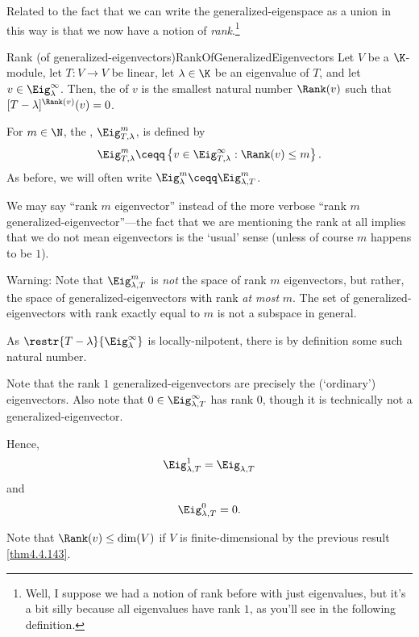Related to the fact that we can write the generalized-eigenspace as a union in this way is that we now have a notion of \emph{rank}.\footnote{Well, I suppose we had a notion of rank before with just eigenvalues, but it's a bit silly because all eigenvalues have rank $1$, as you'll see in the following definition.}
\begin{dfn}{Rank (of generalized-eigenvec\-tors)}{RankOfGeneralizedEigenvectors}
	Let $V$ be a $\K$-module, let $T\colon V\rightarrow V$ be linear, let $\lambda \in \K$ be an eigenvalue of $T$, and let $v\in \Eig _{\lambda}^{\infty}$.  Then, the  of $v$ is the smallest natural number $\Rank (v)$ such that $[T-\lambda ]^{\Rank (v)}(v)=0$.
	\begin{rmk}
		For $m\in \N$, the , $\Eig _{T,\lambda}^m$, is defined by
		\begin{equation}
			\Eig _{T,\lambda}^m\ceqq \left\{ v\in \Eig _{T,\lambda}^{\infty}:\Rank (v)\leq m\right\} .
		\end{equation}
		As before, we will often write $\Eig _{\lambda}^m\ceqq \Eig _{\lambda ,T}^m$.
	\end{rmk}
	\begin{rmk}
		We may say ``rank $m$ eigenvector'' instead of the more verbose ``rank $m$ generalized-eigenvector''---the fact that we are mentioning the rank at all implies that we do not mean eigenvectors is the `usual' sense (unless of course $m$ happens to be $1$).
	\end{rmk}
	\begin{rmk}
		Warning:  Note that $\Eig _{\lambda ,T}^m$ is \emph{not} the space of rank $m$ eigenvectors, but rather, the space of generalized-eigenvectors with rank \emph{at most} $m$.  The set of generalized-eigenvectors with rank exactly equal to $m$ is not a subspace in general.
	\end{rmk}
	\begin{rmk}
		As $\restr{T-\lambda}{\Eig _{\lambda}^{\infty}}$ is locally-nilpotent, there is by definition some such natural number.
	\end{rmk}
	\begin{rmk}
		Note that the rank $1$ generalized-eigenvectors are precisely the (`ordinary') eigenvectors.  Also note that $0\in \Eig _{\lambda ,T}^{\infty}$ has rank $0$, though it is technically not a generalized-eigenvector.
	\end{rmk}
	\begin{rmk}
		Hence,
		\begin{equation}
			\Eig _{\lambda ,T}^1=\Eig _{\lambda ,T}
		\end{equation}
		and
		\begin{equation}
			\Eig _{\lambda ,T}^0=0.
		\end{equation}
	\end{rmk}
	\begin{rmk}
		Note that $\Rank (v)\leq \dim (V)$ if $V$ is finite-dimensional by the previous result \cref{thm4.4.143}.
	\end{rmk}
\end{dfn}

